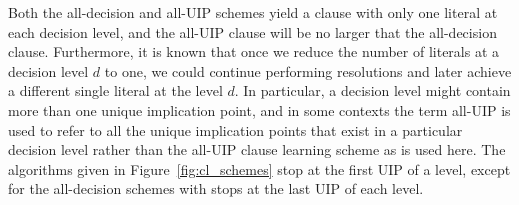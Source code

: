 \documentclass[runningheads]{llncs}
\newcommand{\alluip}{all-UIP\xspace}
\begin{document}
Both the all-decision and \alluip schemes yield a clause with only one
literal at each decision level, and the \alluip clause will be no
larger that the all-decision clause. Furthermore, it is known
\cite{DBLP:journals/tc/Marques-SilvaS99} that once we reduce the
number of literals at a decision level $d$ to one, we could continue
performing resolutions and later achieve a different single literal at
the level $d$. In particular, a decision level might contain more than
one unique implication point, and in some contexts the term all-UIP is
used to refer to all the unique implication points that exist in a
particular decision level \cite{DBLP:conf/sat/SabharwalSS12} rather
than the \alluip clause learning scheme as is used here. The
algorithms given in Figure~\ref{fig:cl_schemes} stop at the first UIP
of a level, except for the all-decision schemes with stops at the last
UIP of each level.
\end{document}
